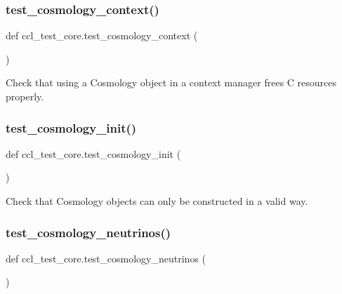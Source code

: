 \subsubsection{\texorpdfstring{test\+\_\+cosmology\+\_\+context()}{test\_cosmology\_context()}}
{\footnotesize\ttfamily def ccl\+\_\+test\+\_\+core.\+test\+\_\+cosmology\+\_\+context (\begin{DoxyParamCaption}{ }\end{DoxyParamCaption})}

\begin{DoxyVerb}Check that using a Cosmology object in a context manager frees C resources properly.\end{DoxyVerb}
 \mbox{\label{namespaceccl__test__core_a4d2642cc4efaf3e38a2ba27fecc98abd}} 
\subsubsection{\texorpdfstring{test\+\_\+cosmology\+\_\+init()}{test\_cosmology\_init()}}
{\footnotesize\ttfamily def ccl\+\_\+test\+\_\+core.\+test\+\_\+cosmology\+\_\+init (\begin{DoxyParamCaption}{ }\end{DoxyParamCaption})}

\begin{DoxyVerb}Check that Cosmology objects can only be constructed in a valid way.
\end{DoxyVerb}
 \mbox{\label{namespaceccl__test__core_ad7e087ba6d61d749605619aa335fbaa6}} 
\subsubsection{\texorpdfstring{test\+\_\+cosmology\+\_\+neutrinos()}{test\_cosmology\_neutrinos()}}
{\footnotesize\ttfamily def ccl\+\_\+test\+\_\+core.\+test\+\_\+cosmology\+\_\+neutrinos (\begin{DoxyParamCaption}{ }\end{DoxyParamCaption})}


